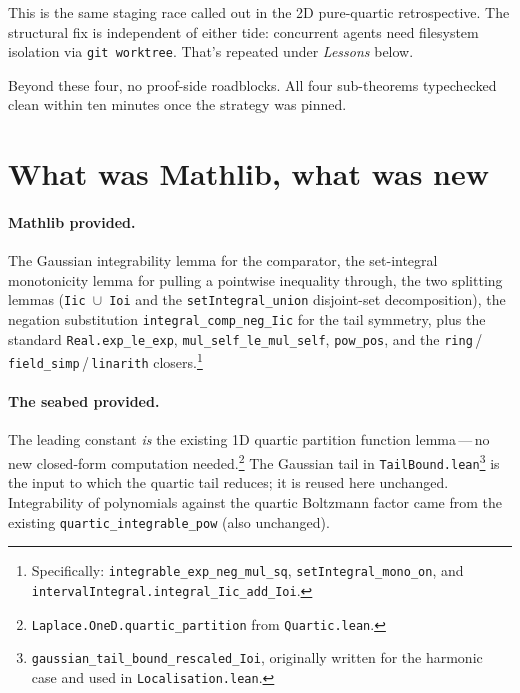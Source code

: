 \documentclass[11pt]{article}
\begin{document}
This is the same staging race called out in the 2D pure-quartic
retrospective. The structural fix is independent of either tide:
concurrent agents need filesystem isolation via \texttt{git worktree}.
That's repeated under \emph{Lessons} below.

Beyond these four, no proof-side roadblocks. All four sub-theorems
typechecked clean within ten minutes once the strategy was pinned.

\section{What was Mathlib, what was new}

\paragraph{Mathlib provided.}
The Gaussian integrability lemma for the comparator, the set-integral
monotonicity lemma for pulling a pointwise inequality through, the two
splitting lemmas (\texttt{Iic\,$\cup$\,Ioi} and the
\texttt{setIntegral\_union} disjoint-set decomposition), the negation
substitution \texttt{integral\_comp\_neg\_Iic} for the tail symmetry,
plus the standard \texttt{Real.exp\_le\_exp},
\texttt{mul\_self\_le\_mul\_self}, \texttt{pow\_pos}, and the
\texttt{ring}\,/\,\texttt{field\_simp}\,/\,\texttt{linarith}
closers.\footnote{Specifically: \texttt{integrable\_exp\_neg\_mul\_sq},
\texttt{setIntegral\_mono\_on}, and
\texttt{intervalIntegral.integral\_Iic\_add\_Ioi}.}

\paragraph{The seabed provided.}
The leading constant \emph{is} the existing 1D quartic partition
function lemma\,---\,no new closed-form computation
needed.\footnote{\texttt{Laplace.OneD.quartic\_partition} from
\texttt{Quartic.lean}.} The Gaussian tail in
\texttt{TailBound.lean}\footnote{\texttt{gaussian\_tail\_bound\_rescaled\_Ioi},
originally written for the harmonic case and used in
\texttt{Localisation.lean}.} is the input to which the quartic tail
reduces; it is reused here unchanged. Integrability of polynomials
against the quartic Boltzmann factor came from the existing
\texttt{quartic\_integrable\_pow} (also unchanged).
\end{document}
